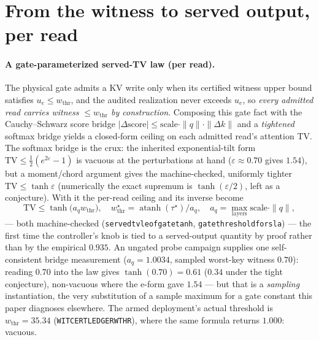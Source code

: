 \documentclass[11pt]{article}
\renewcommand{\_}{\WCorigunderscore\allowbreak}
\begin{document}
\section{From the witness to served output, per read}
\label{sec:perread}

\paragraph{A gate-parameterized served-TV law (per read).}
The physical gate admits a KV write only when its certified witness
upper bound satisfies $u_e\le w_{\mathrm{thr}}$, and the audited
realization never exceeds $u_e$, so \emph{every admitted read carries
witness $\le w_{\mathrm{thr}}$ by construction}. Composing this gate
fact with the Cauchy--Schwarz score bridge
$|\Delta\mathrm{score}|\le\mathrm{scale}\cdot\|q\|\cdot\|\Delta k\|$
and a \emph{tightened} softmax bridge yields a closed-form ceiling on
each admitted read's attention TV. The softmax bridge is the crux: the
inherited exponential-tilt form $\mathrm{TV}\le\tfrac12(e^{2\varepsilon}-1)$
is vacuous at the perturbations at hand ($\varepsilon\approx0.70$ gives
$1.54$), but a moment/chord argument gives the machine-checked,
uniformly tighter $\mathrm{TV}\le\tanh\varepsilon$ (numerically the
exact supremum is $\tanh(\varepsilon/2)$, left as a conjecture). With
it the per-read ceiling and its inverse become
\begin{equation}\label{eq:gatelaw}
  \mathrm{TV}\le \tanh\!\bigl(a_q w_{\mathrm{thr}}\bigr),
  \quad
  w_{\mathrm{thr}}^\star=\operatorname{atanh}(\tau^\star)/a_q,
  \quad a_q=\max_{\text{layers}}\mathrm{scale}\cdot\|q\|,
\end{equation}
--- both machine-checked (\texttt{served\_tv\_le\_of\_gate\_tanh},
\texttt{gate\_threshold\_for\_sla}) --- the first time the controller's
knob is tied to a served-output quantity by proof rather than by the
empirical $0.935$. An ungated probe campaign supplies one
self-consistent bridge measurement ($a_q=1.0034$, sampled worst-key
witness $0.70$): reading $0.70$ into the law gives $\tanh(0.70)=0.61$
($0.34$ under the tight conjecture), non-vacuous where the e-form gave
$1.54$ --- but that is a \emph{sampling} instantiation, the very
substitution of a sample maximum for a gate constant this paper
diagnoses elsewhere. The armed deployment's actual threshold is
$w_{\mathrm{thr}}=35.34$ (\texttt{WITCERT\_LEDGER\_WTHR}), where the
same formula returns $1.000$: vacuous.
\end{document}
